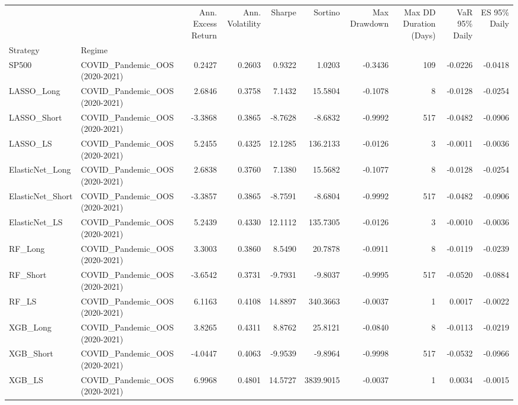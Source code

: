 \begin{tabular}{llrrrrrrrr}
\toprule
 &  & Ann. Excess Return & Ann. Volatility & Sharpe & Sortino & Max Drawdown & Max DD Duration (Days) & VaR 95\% Daily & ES 95\% Daily \\
Strategy & Regime &  &  &  &  &  &  &  &  \\
\midrule
SP500 & COVID\_Pandemic\_OOS (2020-2021) & 0.2427 & 0.2603 & 0.9322 & 1.0203 & -0.3436 & 109 & -0.0226 & -0.0418 \\
\cline{1-10}
LASSO\_Long & COVID\_Pandemic\_OOS (2020-2021) & 2.6846 & 0.3758 & 7.1432 & 15.5804 & -0.1078 & 8 & -0.0128 & -0.0254 \\
\cline{1-10}
LASSO\_Short & COVID\_Pandemic\_OOS (2020-2021) & -3.3868 & 0.3865 & -8.7628 & -8.6832 & -0.9992 & 517 & -0.0482 & -0.0906 \\
\cline{1-10}
LASSO\_LS & COVID\_Pandemic\_OOS (2020-2021) & 5.2455 & 0.4325 & 12.1285 & 136.2133 & -0.0126 & 3 & -0.0011 & -0.0036 \\
\cline{1-10}
ElasticNet\_Long & COVID\_Pandemic\_OOS (2020-2021) & 2.6838 & 0.3760 & 7.1380 & 15.5682 & -0.1077 & 8 & -0.0128 & -0.0254 \\
\cline{1-10}
ElasticNet\_Short & COVID\_Pandemic\_OOS (2020-2021) & -3.3857 & 0.3865 & -8.7591 & -8.6804 & -0.9992 & 517 & -0.0482 & -0.0906 \\
\cline{1-10}
ElasticNet\_LS & COVID\_Pandemic\_OOS (2020-2021) & 5.2439 & 0.4330 & 12.1112 & 135.7305 & -0.0126 & 3 & -0.0010 & -0.0036 \\
\cline{1-10}
RF\_Long & COVID\_Pandemic\_OOS (2020-2021) & 3.3003 & 0.3860 & 8.5490 & 20.7878 & -0.0911 & 8 & -0.0119 & -0.0239 \\
\cline{1-10}
RF\_Short & COVID\_Pandemic\_OOS (2020-2021) & -3.6542 & 0.3731 & -9.7931 & -9.8037 & -0.9995 & 517 & -0.0520 & -0.0884 \\
\cline{1-10}
RF\_LS & COVID\_Pandemic\_OOS (2020-2021) & 6.1163 & 0.4108 & 14.8897 & 340.3663 & -0.0037 & 1 & 0.0017 & -0.0022 \\
\cline{1-10}
XGB\_Long & COVID\_Pandemic\_OOS (2020-2021) & 3.8265 & 0.4311 & 8.8762 & 25.8121 & -0.0840 & 8 & -0.0113 & -0.0219 \\
\cline{1-10}
XGB\_Short & COVID\_Pandemic\_OOS (2020-2021) & -4.0447 & 0.4063 & -9.9539 & -9.8964 & -0.9998 & 517 & -0.0532 & -0.0966 \\
\cline{1-10}
XGB\_LS & COVID\_Pandemic\_OOS (2020-2021) & 6.9968 & 0.4801 & 14.5727 & 3839.9015 & -0.0037 & 1 & 0.0034 & -0.0015 \\

\end{tabular}
